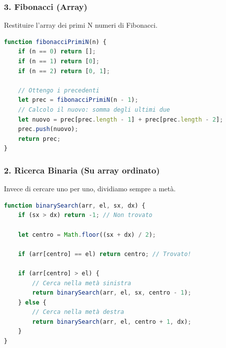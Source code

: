 \subsubsection{3. Fibonacci (Array)}
Restituire l'array dei primi N numeri di Fibonacci.
\begin{lstlisting}[language=JavaScript]
function fibonacciPrimiN(n) {
    if (n == 0) return [];
    if (n == 1) return [0];
    if (n == 2) return [0, 1];
    
    // Ottengo i precedenti
    let prec = fibonacciPrimiN(n - 1);
    // Calcolo il nuovo: somma degli ultimi due
    let nuovo = prec[prec.length - 1] + prec[prec.length - 2];
    prec.push(nuovo);
    return prec;
}
\end{lstlisting}

\subsubsection{2. Ricerca Binaria (Su array ordinato)}
Invece di cercare uno per uno, dividiamo sempre a metà.
\begin{lstlisting}[language=JavaScript]
function binarySearch(arr, el, sx, dx) {
    if (sx > dx) return -1; // Non trovato
    
    let centro = Math.floor((sx + dx) / 2);
    
    if (arr[centro] == el) return centro; // Trovato!
    
    if (arr[centro] > el) {
        // Cerca nella metà sinistra
        return binarySearch(arr, el, sx, centro - 1);
    } else {
        // Cerca nella metà destra
        return binarySearch(arr, el, centro + 1, dx);
    }
}
\end{lstlisting}
